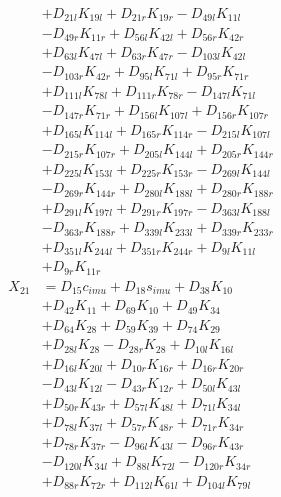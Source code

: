 \begin{multicols}{2}
\begin{align}
&+ D_{21l}K_{19l} + D_{21r}K_{19r} - D_{49l}K_{11l}  \nonumber \\
&- D_{49r}K_{11r} + D_{56l}K_{42l} + D_{56r}K_{42r}  \nonumber \\
&+ D_{63l}K_{47l} + D_{63r}K_{47r} - D_{103l}K_{42l}  \nonumber \\
&- D_{103r}K_{42r} + D_{95l}K_{71l} + D_{95r}K_{71r}  \nonumber \\
&+ D_{111l}K_{78l} + D_{111r}K_{78r} - D_{147l}K_{71l}  \nonumber \\
&- D_{147r}K_{71r} + D_{156l}K_{107l} + D_{156r}K_{107r}  \nonumber \\
&+ D_{165l}K_{114l} + D_{165r}K_{114r} - D_{215l}K_{107l}  \nonumber \\
&- D_{215r}K_{107r} + D_{205l}K_{144l} + D_{205r}K_{144r}  \nonumber \\
&+ D_{225l}K_{153l} + D_{225r}K_{153r} - D_{269l}K_{144l}  \nonumber \\
&- D_{269r}K_{144r} + D_{280l}K_{188l} + D_{280r}K_{188r}  \nonumber \\
&+ D_{291l}K_{197l} + D_{291r}K_{197r} - D_{363l}K_{188l}  \nonumber \\
&- D_{363r}K_{188r} + D_{339l}K_{233l} + D_{339r}K_{233r}  \nonumber \\
&+ D_{351l}K_{244l} + D_{351r}K_{244r} + D_{9l}K_{11l}  \nonumber \\
&+ D_{9r}K_{11r} \nonumber \\
X_{21} &= D_{15}c_{imu} + D_{18}s_{imu} + D_{38}K_{10}  \nonumber \\
&+ D_{42}K_{11} + D_{69}K_{10} + D_{49}K_{34}  \nonumber \\
&+ D_{64}K_{28} + D_{59}K_{39} + D_{74}K_{29}  \nonumber \\
&+ D_{28l}K_{28} - D_{28r}K_{28} + D_{10l}K_{16l}  \nonumber \\
&+ D_{16l}K_{20l} + D_{10r}K_{16r} + D_{16r}K_{20r}  \nonumber \\
&- D_{43l}K_{12l} - D_{43r}K_{12r} + D_{50l}K_{43l}  \nonumber \\
&+ D_{50r}K_{43r} + D_{57l}K_{48l} + D_{71l}K_{34l}  \nonumber \\
&+ D_{78l}K_{37l} + D_{57r}K_{48r} + D_{71r}K_{34r}  \nonumber \\
&+ D_{78r}K_{37r} - D_{96l}K_{43l} - D_{96r}K_{43r}  \nonumber \\
&- D_{120l}K_{34l} + D_{88l}K_{72l} - D_{120r}K_{34r}  \nonumber \\
&+ D_{88r}K_{72r} + D_{112l}K_{61l} + D_{104l}K_{79l}  \nonumber \\

\end{align}
\end{multicols}
